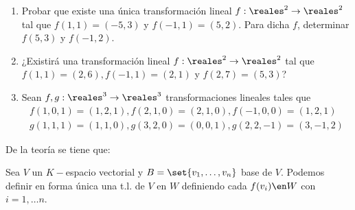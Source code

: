 \begin{enunciado}{\ejercicio}
  \begin{enumerate}[label=(\alph*)]
    \item Probar que existe una única transformación lineal $f : \reales^2 \to \reales^2$ tal que
          $f(1,1) = (-5, 3)$ y $f(-1,1) = (5,2)$. Para dicha $f$, determinar $f(5,3)$ y $f(-1,2)$.

    \item ¿Existirá una transformación lineal $f : \reales^2 \to \reales^2$ tal que $f(1,1) = (2,6), f(-1,1) = (2,1)$ y
          $f(2,7) = (5,3)$?

    \item Sean $f, g: \reales^3 \to \reales^3$ transformaciones lineales tales que
          $$
            \begin{array}{l}
              f(1,0,1) = (1,2,1), f(2,1,0) = (2,1,0), f(-1,0,0) = (1,2,1) \\
              g(1,1,1) = (1,1,0), g(3,2,0) = (0,0,1), g(2,2,-1) = (3,-1,2)
            \end{array}
          $$
  \end{enumerate}
\end{enunciado}

De la teoría se tiene que:
\begin{center}
  Sea $V$ un $K-$espacio vectorial y $B=\set{v_1,\ldots, v_n}$ base de $V$.
  Podemos definir en forma única una t.l. de $V$ en $W$ definiendo cada $f(v_i) \en W$
  con $i=1,\ldots n$.
\end{center}

